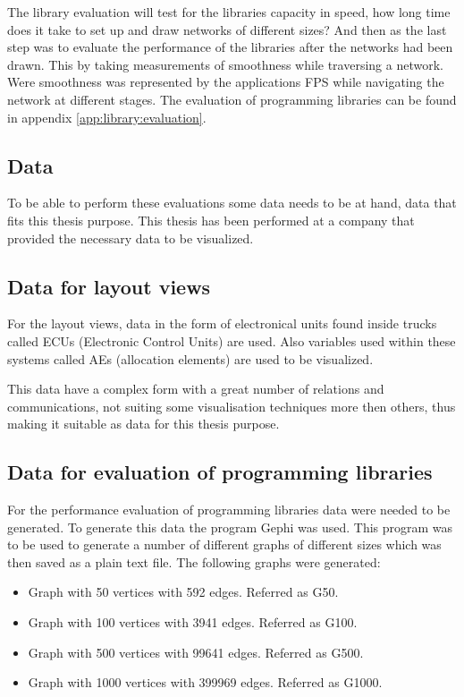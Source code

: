 \documentclass[a4paper,11pt]{kth-mag}
\begin{document}
The library evaluation will test for the libraries capacity in speed, how long time does it take to set up and draw networks of different sizes? And then as the last step was to evaluate the performance 
of the libraries after the networks had been drawn. This by taking measurements of smoothness while traversing a network. Were smoothness was represented by the applications FPS while navigating the 
network at different stages. The evaluation of programming libraries can be found in appendix \ref{app:library:evaluation}.
\subsection{Data}
To be able to perform these evaluations some data needs to be at hand, data that fits this thesis purpose. This thesis has been performed at a company that provided the necessary data to be visualized.
\subsection{Data for layout views}
\label{data:layout-views}
For the layout views, data in the form of electronical units found inside trucks called ECUs (Electronic Control Units) are used. Also variables used within these systems called AEs (allocation elements)
 are used to be visualized. 
 
This data have a complex form with a great number of relations and communications, not suiting some visualisation techniques more then others, thus making it suitable as data for this thesis purpose.
\subsection{Data for evaluation of programming libraries}
For the performance evaluation of programming libraries data were needed to be generated. To generate this data the program Gephi\cite{website:gephi} was used. This program was to be used to generate a number of different 
graphs of different sizes which was then saved as a plain text file. The following graphs were generated:\
\begin{itemize}
	\item{Graph with 50 vertices with 592 edges. Referred as G50.}
	\item{Graph with 100 vertices with 3941 edges. Referred as G100.}
	\item{Graph with 500 vertices with 99641 edges. Referred as G500.}
	\item{Graph with 1000 vertices with 399969 edges. Referred as G1000.}
\end{itemize}
\end{document}
